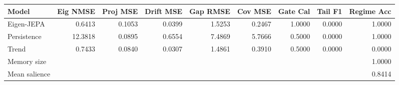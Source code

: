 \begin{tabular}{lrrrrrrrr}
\toprule
Model & Eig NMSE & Proj MSE & Drift MSE & Gap RMSE & Cov MSE & Gate Cal & Tail F1 & Regime Acc \\
\midrule
Eigen-JEPA & 0.6413 & 0.1053 & 0.0399 & 1.5253 & 0.2467 & 1.0000 & 0.0000 & 1.0000 \\
Persistence & 12.3818 & 0.0895 & 0.6554 & 7.4869 & 5.7666 & 0.5000 & 0.0000 & 1.0000 \\
Trend & 0.7433 & 0.0840 & 0.0307 & 1.4861 & 0.3910 & 0.5000 & 0.0000 & 0.0000 \\
\midrule
Memory size & \multicolumn{8}{r}{1.0000} \\
Mean salience & \multicolumn{8}{r}{0.8414} \\
\bottomrule
\end{tabular}